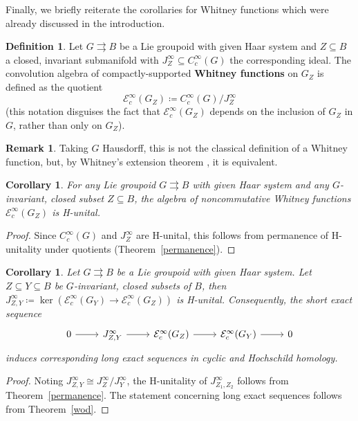 \documentclass[12pt]{article}
\theoremstyle{plain}
\newtheorem{cor}[thm]{Corollary}
\theoremstyle{definition}
\newtheorem{defn}[thm]{Definition}
\newtheorem{rmk}[thm]{Remark}
\numberwithin{equation}{section}
\begin{document}
Finally, we briefly reiterate the corollaries  for Whitney functions which were already discussed in the introduction.

\begin{defn}
Let $G\rightrightarrows B$ be a Lie groupoid with given Haar system and $Z \subseteq B$ a closed,  invariant submanifold with $J_Z^\infty \subseteq C_c^\infty(G)$ the corresponding ideal.  The convolution algebra of compactly-supported \textbf{Whitney functions} on $G_Z$ is defined as the quotient
\[ \mathcal{E}^\infty_c(G_Z) \coloneqq C_c^\infty(G)/J_Z^\infty \] 
(this notation disguises the fact that $\mathcal{E}^\infty_c(G_Z)$ depends on the inclusion of $G_Z$ in $G$, rather than only on $G_Z$). 
\end{defn}



\begin{rmk}
Taking $G$ Hausdorff, this  is not the classical definition of a Whitney function, but,  by Whitney's extension theorem \cite{Whitney}, it is equivalent. 
\end{rmk}

 
\begin{cor}
For any Lie groupoid $G\rightrightarrows B$ with given Haar system and any $G$-invariant, closed subset $Z \subseteq B$, the algebra of noncommutative Whitney functions $\mathcal{E}_c^\infty(G_Z)$ is H-unital.
\end{cor} 
\begin{proof}
Since $C_c^\infty(G)$ and $J_Z^\infty$ are H-unital, this follows from permanence of H-unitality under  quotients (Theorem~\ref{permanence}).
\end{proof}






\begin{cor}
Let $G\rightrightarrows B$ be a Lie groupoid with given Haar system. Let $Z \subseteq Y \subseteq B$ be $G$-invariant, closed subsets of  $B$, then $J^\infty_{Z,Y} \coloneqq \ker\left(\mathcal{E}_c^\infty(G_Y) \to \mathcal{E}_c^\infty(G_Z)\right)$ is H-unital. Consequently, the short exact sequence
\[ \begin{tikzcd} 
0 \ar[r] & J_{Z,Y}^\infty \ar[r] & \mathcal{E}_c^\infty(G_Z) \ar[r] &  \mathcal{E}_c^\infty(G_Y) \ar[r] & 0
\end{tikzcd}
\]
induces corresponding long exact sequences in cyclic and Hochschild homology.
\end{cor}
\begin{proof}
Noting $J_{Z,Y}^\infty \cong {J^\infty_{Z}}/{J^\infty_{Y}}$, the H-unitality of $J_{Z_1,Z_2}^\infty$ follows from Theorem~\ref{permanence}. The statement concerning long exact sequences follows from Theorem~\ref{wod}.
\end{proof}
 
\end{document}
